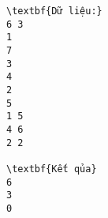 \begin{verbatim}
\textbf{Dữ liệu:}
6 3
1
7
3
4
2
5
1 5
4 6
2 2

\textbf{Kết qủa}
6
3
0
\end{verbatim}